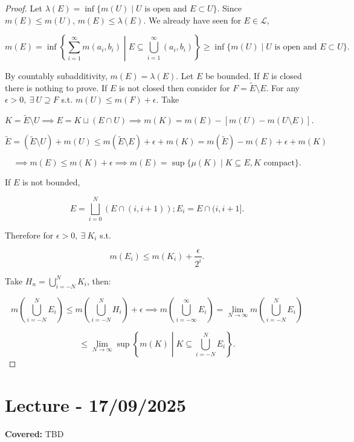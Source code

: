 \documentclass{functionspaces}
\begin{document}
\begin{proof}
Let $\lambda(E) = \inf\{m(U) \mid U \text{ is open and } E \subset U\}$. Since $m(E) \leq m(U)$, $m(E) \leq \lambda(E)$. We already have seen for $E \in \mathcal{L}$,

\[
m(E) = \inf\left\{\sum_{i=1}^{\infty} m(a_{i},b_{i}) \middle| E \subseteq \bigcup_{i=1}^{\infty} (a_{i},b_{i})\right\} \geq \inf\{m(U) \mid U \text{ is open and } E \subset U\}.
\]

By countably subadditivity, $m(E) = \lambda(E)$. Let $E$ be bounded. If $E$ is closed there is nothing to prove. If $E$ is not closed then consider for $F = \tilde{E} \setminus E$. For any $\epsilon > 0,\ \exists\ U \supseteq F$ s.t. $m(U) \leq m(F) + \epsilon$. Take

\[
K = \tilde{E} \setminus U \implies E = K \sqcup (E \cap U) \implies m(K) = m(E) - [m(U) - m(U \setminus E)].
\]

\[
\tilde{E} = (\tilde{E} \setminus U) + m(U) \leq m(\tilde{E} \setminus E) + \epsilon + m(K) = m(\tilde{E}) - m(E) + \epsilon + m(K)
\]

\[
\implies m(E) \leq m(K) + \epsilon \implies m(E) = \sup\{\mu(K) \mid K \subseteq E, K \text{ compact}\}.
\]

If $E$ is not bounded,

\[
E = \bigsqcup_{i=0}^{N} (E \cap (i,i+1)); E_{i} = E \cap (i,i+1].
\]

Therefore for $\epsilon > 0,\ \exists\ K_{i}$ s.t.

\[
m(E_{i}) \leq m(K_{i}) + \frac{\epsilon}{2^{i}}.
\]

Take $H_{n} = \bigcup_{i=-N}^{N} K_{i}$, then:

\[
m\left(\bigcup_{i=-N}^{N} E_{i}\right) \leq m\left(\bigcup_{i=-N}^{N} H_{i}\right) + \epsilon \implies m\left(\bigcup_{i=-\infty}^{\infty} E_{i}\right) = \lim_{N \to \infty} m\left(\bigcup_{i=-N}^{N} E_{i}\right)
\]

\[
\leq \lim_{N \to \infty} \sup \left\{m(K) \middle| K \subseteq \bigcup_{i=-N}^{N} E_{i}\right\}.
\]
\end{proof}

\endgroup

\newpage
\section{Lecture - 17/09/2025}

\textbf{Covered:} TBD

\begingroup
\setlength{\parskip}{6pt}
\setlength{\parindent}{0pt}
\end{document}
